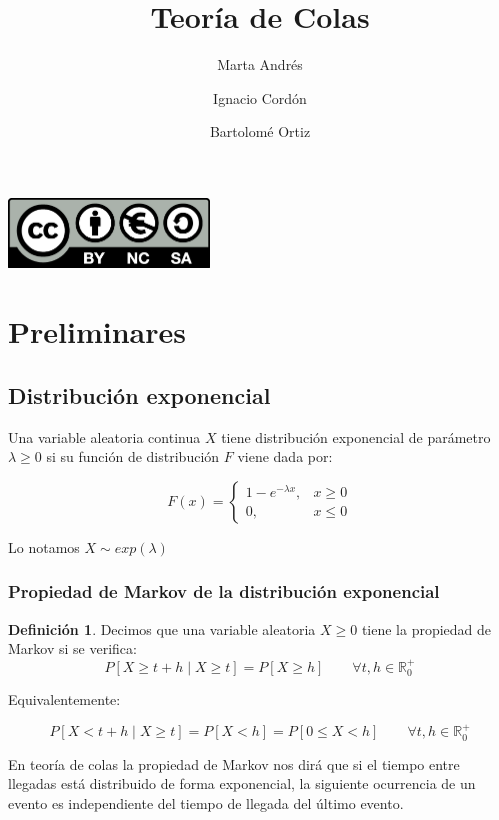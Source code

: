 \documentclass[a4paper,10pt]{scrartcl}
\title{Teoría de Colas}
\author{
  Marta Andrés\and
  Ignacio Cordón\and
  Bartolomé Ortiz\and
}
\date{}
\theoremstyle{definition}
\newtheorem*{mydef}{Definición}
\numberwithin{equation}{section}
\begin{document}
\maketitle

\begin{center}
	\includegraphics[width=0.4\textwidth]{./imgs/by-nc-sa.png}
\end{center}

\tableofcontents
\pagebreak

\section{Preliminares}

\subsection{Distribución exponencial}

Una variable aleatoria continua $X$ tiene distribución exponencial de parámetro $\lambda \ge 0$ si su función de distribución
$F$ viene dada por:

\[F(x) = \left\{\begin{array}{ll}
         1- e^{-\lambda x} ,& x\ge 0\\
         0 ,& x\le 0
         \end{array}\right.\]
         
Lo notamos $X \sim exp(\lambda)$

\subsubsection{Propiedad de Markov de la distribución exponencial}

\begin{mydef}
 Decimos que una variable aleatoria $X \ge 0$ tiene la propiedad de Markov si se verifica:
 \[P[X \ge t+h \mid X \ge t] = P[X \ge h] \qquad \forall t,h \in \mathbb{R}_0^{+}\]
\end{mydef}

Equivalentemente:

\[P[X < t+h \mid X \ge t] = P[X < h] = P[ 0 \le X < h] \qquad \forall t,h \in \mathbb{R}_0^{+}\]

En teoría de colas la propiedad de Markov nos dirá que si el tiempo entre llegadas está distribuido de forma exponencial, 
la siguiente ocurrencia de un evento es independiente del tiempo de llegada del último evento.
\end{document}
